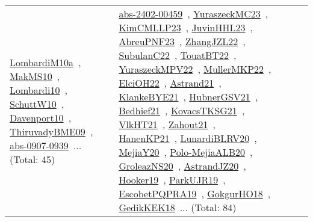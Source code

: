 {\begin{longtable}{lp{3cm}>{\raggedright\arraybackslash}p{6cm}>{\raggedright\arraybackslash}p{6cm}>{\raggedright\arraybackslash}p{8cm}}
\href{works/LombardiM10a.pdf}{LombardiM10a}~\cite{LombardiM10a}, \href{works/MakMS10.pdf}{MakMS10}~\cite{MakMS10}, \href{works/Lombardi10.pdf}{Lombardi10}~\cite{Lombardi10}, \href{works/SchuttW10.pdf}{SchuttW10}~\cite{SchuttW10}, \href{works/Davenport10.pdf}{Davenport10}~\cite{Davenport10}, \href{works/ThiruvadyBME09.pdf}{ThiruvadyBME09}~\cite{ThiruvadyBME09}, \href{works/abs-0907-0939.pdf}{abs-0907-0939}~\cite{abs-0907-0939}... (Total: 45) & \href{works/abs-2402-00459.pdf}{abs-2402-00459}~\cite{abs-2402-00459}, \href{works/YuraszeckMC23.pdf}{YuraszeckMC23}~\cite{YuraszeckMC23}, \href{works/KimCMLLP23.pdf}{KimCMLLP23}~\cite{KimCMLLP23}, \href{works/JuvinHHL23.pdf}{JuvinHHL23}~\cite{JuvinHHL23}, \href{works/AbreuPNF23.pdf}{AbreuPNF23}~\cite{AbreuPNF23}, \href{works/ZhangJZL22.pdf}{ZhangJZL22}~\cite{ZhangJZL22}, \href{works/SubulanC22.pdf}{SubulanC22}~\cite{SubulanC22}, \href{works/TouatBT22.pdf}{TouatBT22}~\cite{TouatBT22}, \href{works/YuraszeckMPV22.pdf}{YuraszeckMPV22}~\cite{YuraszeckMPV22}, \href{works/MullerMKP22.pdf}{MullerMKP22}~\cite{MullerMKP22}, \href{works/ElciOH22.pdf}{ElciOH22}~\cite{ElciOH22}, \href{works/Astrand21.pdf}{Astrand21}~\cite{Astrand21}, \href{works/KlankeBYE21.pdf}{KlankeBYE21}~\cite{KlankeBYE21}, \href{works/HubnerGSV21.pdf}{HubnerGSV21}~\cite{HubnerGSV21}, \href{works/Bedhief21.pdf}{Bedhief21}~\cite{Bedhief21}, \href{works/KovacsTKSG21.pdf}{KovacsTKSG21}~\cite{KovacsTKSG21}, \href{works/VlkHT21.pdf}{VlkHT21}~\cite{VlkHT21}, \href{works/Zahout21.pdf}{Zahout21}~\cite{Zahout21}, \href{works/HanenKP21.pdf}{HanenKP21}~\cite{HanenKP21}, \href{works/LunardiBLRV20.pdf}{LunardiBLRV20}~\cite{LunardiBLRV20}, \href{works/MejiaY20.pdf}{MejiaY20}~\cite{MejiaY20}, \href{works/Polo-MejiaALB20.pdf}{Polo-MejiaALB20}~\cite{Polo-MejiaALB20}, \href{works/GroleazNS20.pdf}{GroleazNS20}~\cite{GroleazNS20}, \href{works/AstrandJZ20.pdf}{AstrandJZ20}~\cite{AstrandJZ20}, \href{works/Hooker19.pdf}{Hooker19}~\cite{Hooker19}, \href{works/ParkUJR19.pdf}{ParkUJR19}~\cite{ParkUJR19}, \href{works/EscobetPQPRA19.pdf}{EscobetPQPRA19}~\cite{EscobetPQPRA19}, \href{works/GokgurHO18.pdf}{GokgurHO18}~\cite{GokgurHO18}, \href{works/GedikKEK18.pdf}{GedikKEK18}~\cite{GedikKEK18}... (Total: 84)\\

\end{longtable}}
